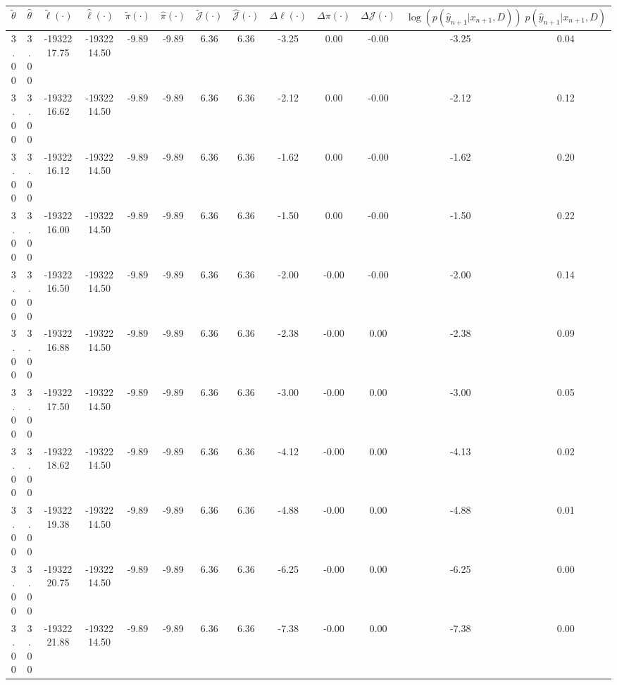 \begin{table}[htbp]
        \centering
        \tiny
        \begin{adjustbox}{angle=90}
            \begin{tabular}{|c|c|c|c|c|c|c|c|c|c|c|c|c|}
                \hline
                 $\tilde{\theta}$ & $\hat{\theta}$ & $\tilde{\ell}(\cdot)$ & $\hat{\ell}(\cdot)$ & $\tilde{\pi}(\cdot)$ & $\hat{\pi}(\cdot)$ & $\tilde{\mathcal{J}}(\cdot)$ & $\hat{\mathcal{J}}(\cdot)$ & $\Delta \ell(\cdot)$ & $\Delta \pi(\cdot)$ & $\Delta \mathcal{J}(\cdot)$ & $\log(p(\hat{y}_{n+1}|x_{n+1}, D))$ & $p(\hat{y}_{n+1}|x_{n+1}, D)$ \\
                \hline
                 3.00 & 3.00 & -1932217.75 & -1932214.50 & -9.89 & -9.89 & 6.36 & 6.36 & -3.25 & 0.00 & -0.00 & -3.25 & 0.04\\ \hline
 3.00 & 3.00 & -1932216.62 & -1932214.50 & -9.89 & -9.89 & 6.36 & 6.36 & -2.12 & 0.00 & -0.00 & -2.12 & 0.12\\ \hline
 3.00 & 3.00 & -1932216.12 & -1932214.50 & -9.89 & -9.89 & 6.36 & 6.36 & -1.62 & 0.00 & -0.00 & -1.62 & 0.20\\ \hline
 3.00 & 3.00 & -1932216.00 & -1932214.50 & -9.89 & -9.89 & 6.36 & 6.36 & -1.50 & 0.00 & -0.00 & -1.50 & 0.22\\ \hline
 3.00 & 3.00 & -1932216.50 & -1932214.50 & -9.89 & -9.89 & 6.36 & 6.36 & -2.00 & -0.00 & -0.00 & -2.00 & 0.14\\ \hline
 3.00 & 3.00 & -1932216.88 & -1932214.50 & -9.89 & -9.89 & 6.36 & 6.36 & -2.38 & -0.00 & 0.00 & -2.38 & 0.09\\ \hline
 3.00 & 3.00 & -1932217.50 & -1932214.50 & -9.89 & -9.89 & 6.36 & 6.36 & -3.00 & -0.00 & 0.00 & -3.00 & 0.05\\ \hline
 3.00 & 3.00 & -1932218.62 & -1932214.50 & -9.89 & -9.89 & 6.36 & 6.36 & -4.12 & -0.00 & 0.00 & -4.13 & 0.02\\ \hline
 3.00 & 3.00 & -1932219.38 & -1932214.50 & -9.89 & -9.89 & 6.36 & 6.36 & -4.88 & -0.00 & 0.00 & -4.88 & 0.01\\ \hline
 3.00 & 3.00 & -1932220.75 & -1932214.50 & -9.89 & -9.89 & 6.36 & 6.36 & -6.25 & -0.00 & 0.00 & -6.25 & 0.00\\ \hline
 3.00 & 3.00 & -1932221.88 & -1932214.50 & -9.89 & -9.89 & 6.36 & 6.36 & -7.38 & -0.00 & 0.00 & -7.38 & 0.00\\ \hline
            \end{tabular}
        \end{adjustbox}
        \caption{}
        \label{}
    \end{table}
    